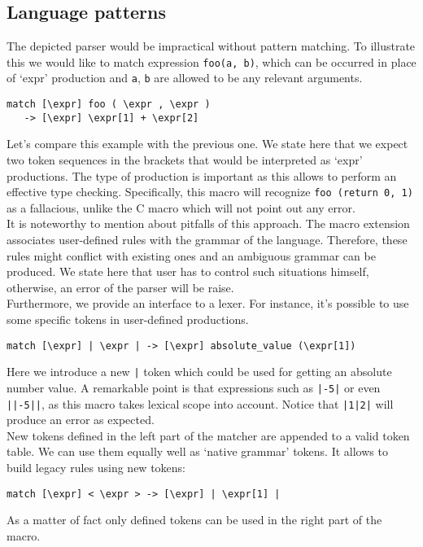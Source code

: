 \subsection{Language patterns}
The depicted parser would be impractical without pattern matching. To
illustrate this we 
would like to match expression \verb|foo(a, b)|, which can be occurred in place 
of `expr' production and \verb|a|, \verb|b| are allowed to be any relevant
arguments.
\begin{verbatim}
match [\expr] foo ( \expr , \expr ) 
   -> [\expr] \expr[1] + \expr[2]
\end{verbatim}
Let's compare this example with the previous one. We state here that we expect
two token sequences in the brackets that would be interpreted as `expr'
productions. The type of production is important as this allows to perform an 
effective type checking. Specifically, this macro will recognize 
\verb|foo (return 0, 1)| as a fallacious, unlike the C macro which will not
point out any error. \\
It is noteworthy to mention about pitfalls of this approach. The macro
extension associates user-defined rules with the grammar of the language.
Therefore, these rules might conflict with existing ones and an ambiguous
grammar can be produced. We state here that user has to control such situations
himself, otherwise, an error of the parser will be raise. \\
Furthermore, we provide an interface to a lexer. For instance, it's possible to
use some specific tokens in user-defined productions.
\begin{verbatim}
match [\expr] | \expr | -> [\expr] absolute_value (\expr[1])
\end{verbatim}
Here we introduce a new \verb/|/ token which could be used for getting an
absolute number value. A remarkable point is that expressions such as 
\verb/|-5|/ or even \verb/||-5||/, as this macro takes lexical scope into
account. Notice that \verb/|1|2|/ will produce an error as expected. \\
New tokens defined in the left part of the matcher are appended to a valid token
table. We can use them equally well as `native grammar' tokens. It allows to
build legacy rules using new tokens:
\begin{verbatim}
match [\expr] < \expr > -> [\expr] | \expr[1] |
\end{verbatim}
As a matter of fact only defined tokens can be used in the right part of the macro. 

